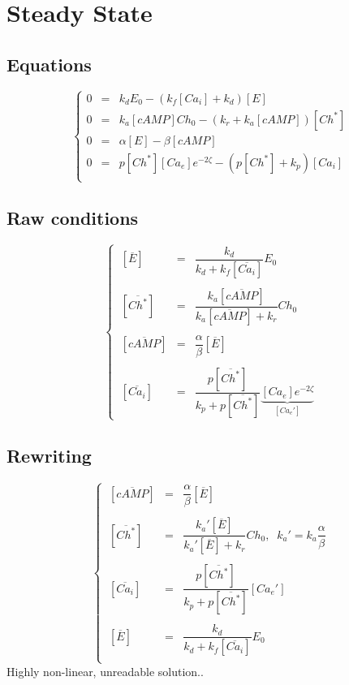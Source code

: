 \documentclass[aps,12pt]{revtex4}
\begin{document}
\section{Steady State}
\subsection{Equations}
\begin{equation}
\left\lbrace
\begin{array}{lcl}
0 & = & k_d E_0 - (k_f[Ca_i]+k_d)[E]\\
0 & = & k_a [cAMP] Ch_0 - (k_r+k_a[cAMP]) [Ch^\ast]\\
0  & = & \alpha [E] - \beta [cAMP]   \\
0  & = & p [Ch^\ast] [Ca_e] e^{-2\zeta}  - (p[Ch^\ast]+k_p) [Ca_i]  \\
\end{array}
\right.
\end{equation}

\subsection{Raw conditions}
\begin{equation}
\left\lbrace
\begin{array}{lcl}
~[\overline{E}] & = & \dfrac{k_d}{k_d+k_f[\overline{Ca_i}]} E_0\\
\\
~[ \overline{Ch^\ast} ] & = & \dfrac{k_a[\overline{cAMP}]}{k_a[\overline{cAMP}]+k_r} Ch_0\\
\\
~[\overline{cAMP}] & = & \dfrac{\alpha}{\beta}[\overline{E}] \\
\\
~[\overline{Ca_i}] & = & \dfrac{p[\overline{Ch^\ast}]}{k_p+p[\overline{Ch^\ast}]} \underbrace{[Ca_e] e^{-2\zeta}}_{[Ca_e']}
\end{array}
\right.
\end{equation}
	
\subsection{Rewriting}	
\begin{equation}
\left\lbrace
\begin{array}{lcl}
~[\overline{cAMP}] & = & \dfrac{\alpha}{\beta}[\overline{E}] \\
\\
~[ \overline{Ch^\ast} ] & = & \dfrac{k_a'[\overline{E}]}{k_a'[\overline{E}]+k_r} Ch_0,\;\; k_a' = k_a \dfrac{\alpha}{\beta}\\
\\
~[\overline{Ca_i}] & = & \dfrac{p[\overline{Ch^\ast}]}{k_p+p[\overline{Ch^\ast}]} [Ca_e']\\
\\
~[\overline{E}] & = & \dfrac{k_d}{k_d+k_f[\overline{Ca_i}]} E_0\\
\end{array}
\right.
\end{equation}
Highly non-linear, unreadable solution..
\end{document}

